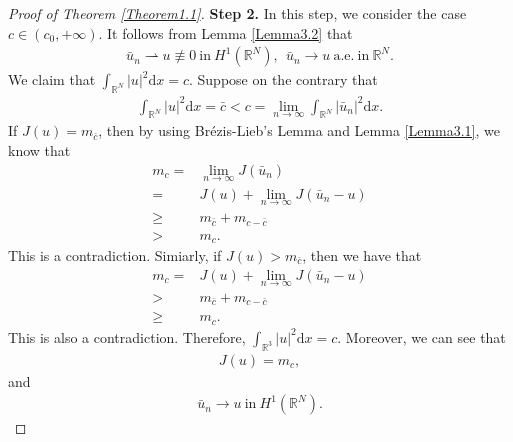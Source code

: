\documentclass[12pt,a4paper,reqno]{amsart}
\numberwithin{equation}{section}
\begin{document}
\begin{proof}[Proof of Theorem \ref{Theorem1.1}]
{\bf Step 2.}
In this step, we consider the case $c\in(c_{0},+\infty)$.
It follows from Lemma \ref{Lemma3.2} that
\begin{equation*}
\begin{aligned}
\bar{u}_{n}\rightharpoonup u\not\equiv0~\mathrm{in}~H^{1}(\mathbb{R}^{N}),
~~
\bar{u}_{n}\to u~\mathrm{a.e.}~\mathrm{in}~\mathbb{R}^{N}.
\end{aligned}
\end{equation*}
We claim that $\int_{\mathbb{R}^{N}}|u|^{2}\mathrm{d}x=c$.
Suppose on the contrary that
\begin{equation*}
\begin{aligned}
\int_{\mathbb{R}^{N}}
|u|^{2}
\mathrm{d}x
=\bar{c}
<c
=
\lim_{n\to\infty}
\int_{\mathbb{R}^{N}}
|\bar{u}_{n}|^{2}
\mathrm{d}x.
\end{aligned}
\end{equation*}
If $J(u)=m_{\bar{c}}$,
then by using Br\'{e}zis-Lieb's Lemma \cite{Brezis-Lieb1983PAMS} and Lemma \ref{Lemma3.1},
we know that
\begin{equation*}
\begin{aligned}
m_{c}
=&\lim_{n\to\infty}J(\bar{u}_{n})\\
=&J(u)
+\lim_{n\to\infty}J(\bar{u}_{n}-u)\\
\geqslant&m_{\bar{c}}+m_{c-\bar{c}}\\
>&m_{c}.
\end{aligned}
\end{equation*}
This is a contradiction.
Simiarly, if $J(u)>m_{\bar{c}}$, then we have that
\begin{equation*}
\begin{aligned}
m_{c}
=&J(u)
+\lim_{n\to\infty}J(\bar{u}_{n}-u)\\
>&m_{\bar{c}}+m_{c-\bar{c}}\\
\geqslant&m_{c}.
\end{aligned}
\end{equation*}
This is also a contradiction. Therefore, $\int_{\mathbb{R}^{3}}|u|^{2}\mathrm{d}x=c$. Moreover, we can see that
\begin{equation*}
\begin{aligned}
J(u)=m_{c},
\end{aligned}
\end{equation*}
and
\begin{equation*}
\begin{aligned}
\bar{u}_{n}\to u~\mathrm{in}~H^{1}(\mathbb{R}^{N}).
\end{aligned}
\end{equation*}



\end{proof}
\end{document}
